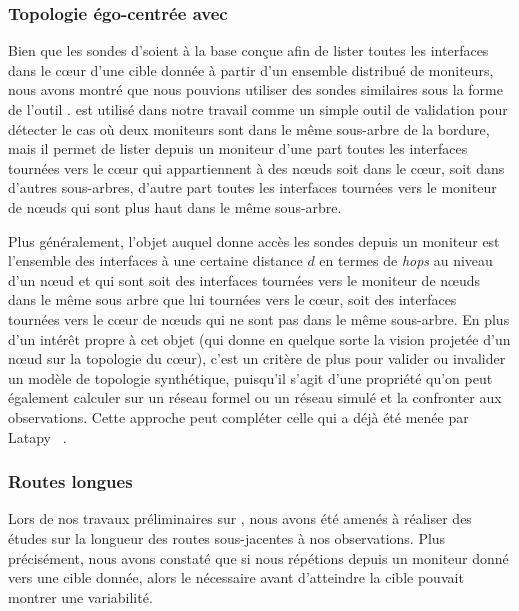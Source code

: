\subsubsection{Topologie égo-centrée avec \udpexplore}

Bien que les sondes d'\udpping soient à la base conçue afin de lister toutes les
interfaces dans le c\oe{}ur d'une cible donnée à partir d'un ensemble distribué
de moniteurs, nous avons montré que nous pouvions utiliser des sondes similaires
sous la forme de l'outil \udpexplore. \udpexplore est utilisé dans notre travail
comme un simple outil de validation pour détecter le cas où deux moniteurs sont
dans le même sous-arbre de la bordure, mais il permet de lister depuis un
moniteur d'une part toutes les interfaces tournées vers le c\oe{}ur qui
appartiennent à des n\oe{}uds soit dans le c\oe{}ur, soit dans d'autres
sous-arbres, d'autre part toutes les interfaces tournées vers le moniteur de
n\oe{}uds qui sont plus haut dans le même sous-arbre.

Plus généralement, l'objet auquel donne accès les sondes \udpping depuis un
moniteur est l'ensemble des interfaces à une certaine distance $d$ en termes de
{\em hops} au niveau \ip d'un n\oe{}ud et qui sont soit des interfaces tournées
vers le moniteur de n\oe{}uds dans le même sous arbre que lui tournées vers le
c\oe{}ur, soit des interfaces tournées vers le c\oe{}ur de n\oe{}uds qui ne sont
pas dans le même sous-arbre.
En plus d'un intérêt propre à cet objet (qui donne en quelque sorte la vision
projetée d'un n\oe{}ud sur la topologie du c\oe{}ur), c'est un critère de plus
pour valider ou invalider un modèle de topologie synthétique, puisqu'il s'agit
d'une propriété qu'on peut également calculer sur un réseau formel ou un réseau
simulé et la confronter aux observations. Cette approche peut compléter celle
qui a déjà été menée par Latapy \etal~\cite{latapy2008radar}.

\subsubsection{Routes longues}

Lors de nos travaux préliminaires sur \traceroute, nous avons été amenés à
réaliser des études sur la longueur des routes sous-jacentes à nos observations.
Plus précisément, nous avons constaté que si nous répétions \traceroute depuis
un moniteur donné vers une cible donnée, alors le \ttl nécessaire avant
d'atteindre la cible pouvait montrer une variabilité.

